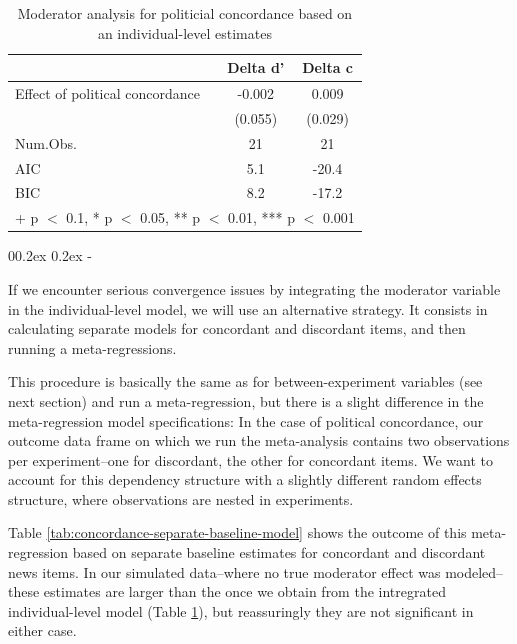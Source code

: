 \documentclass[
  man,mask,floatsintext]{apa6}
\makeatletter
\let\oldsubparagraph\subparagraph
\renewcommand{\subparagraph}{
    \@ifstar
      \xxxSubParagraphStar
      \xxxSubParagraphNoStar
  }
\newcommand{\xxxSubParagraphStar}[1]{\oldsubparagraph*{#1}\mbox{}}
\newcommand{\xxxSubParagraphNoStar}[1]{\oldsubparagraph{#1}\mbox{}}
\renewcommand{\subparagraph}[1]{\@startsection{subparagraph}{5}{1em}%
  {0\baselineskip \@plus 0.2ex \@minus 0.2ex}%
  {-\z@\relax}%
  {\normalfont\normalsize\itshape\hspace{\parindent}{#1}\textit{\addperi}}{\relax}}
\makeatother
\begin{document}
\begin{table}
\centering
\caption{\label{tab:concordance-individual-level}Moderator analysis for politicial concordance based on an individual-level estimates}
\centering
\begin{tabular}[t]{lcc}
\toprule
  & Delta d' & Delta c\\
\midrule
Effect of political concordance & -0.002 & 0.009\\
 & (0.055) & (0.029)\\
\midrule
Num.Obs. & 21 & 21\\
AIC & 5.1 & -20.4\\
BIC & 8.2 & -17.2\\
\bottomrule
\multicolumn{3}{l}{\rule{0pt}{1em}+ p $<$ 0.1, * p $<$ 0.05, ** p $<$ 0.01, *** p $<$ 0.001}\\
\end{tabular}
\end{table}

\subparagraph{ii. Running separate baseline models for concordance}\label{ii.-running-separate-baseline-models-for-concordance}

If we encounter serious convergence issues by integrating the moderator variable in the individual-level model, we will use an alternative strategy. It consists in calculating separate models for concordant and discordant items, and then running a meta-regressions.

This procedure is basically the same as for between-experiment variables (see next section) and run a meta-regression, but there is a slight difference in the meta-regression model specifications: In the case of political concordance, our outcome data frame on which we run the meta-analysis contains two observations per experiment--one for discordant, the other for concordant items. We want to account for this dependency structure with a slightly different random effects structure, where observations are nested in experiments.

Table \ref{tab:concordance-separate-baseline-model} shows the outcome of this meta-regression based on separate baseline estimates for concordant and discordant news items. In our simulated data--where no true moderator effect was modeled--these estimates are larger than the once we obtain from the intregrated individual-level model (Table \ref{tab:concordance-individual-level}), but reassuringly they are not significant in either case.
\end{document}
